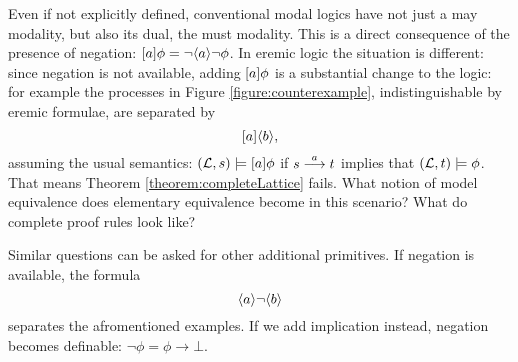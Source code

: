 Even if not explicitly defined, conventional modal logics have not
just a may modality, but also its dual, the must modality. This is a
direct consequence of the presence of negation: $[ a ] \phi = \neg
\langle a \rangle \neg \phi$. In eremic logic the situation is different: since
negation is not available, adding $[ a ] \phi$ is a substantial
change to the logic: for example the processes in Figure
\ref{figure:counterexample}, indistinguishable by eremic formulae, are
separated by
  \[
     [ a ] \langle b \rangle,
  \]
  assuming the usual semantics: $(\mathcal{L}, s) \models [ a ] \phi$ if
  $s \stackrel{a}{\longrightarrow} t$ implies that $(\mathcal{L}, t) \models \phi$. That means
  Theorem \ref{theorem:completeLattice} fails. What notion of model
  equivalence does elementary equivalence become in this scenario?
  What do complete proof rules look like?

  Similar questions can be asked for other additional primitives. If negation is 
  available, the formula
  \[
     \langle a \rangle \neg \langle b \rangle
  \]
  separates the afromentioned examples. If we add implication instead,
  negation becomes definable: $\neg \phi = \phi \rightarrow \bot$.





